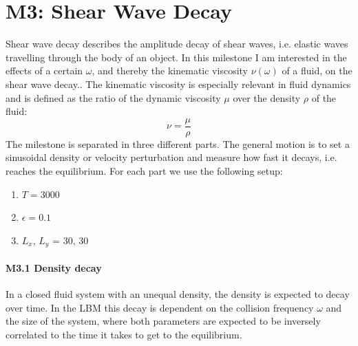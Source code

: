 \documentclass[a4paper,11pt, oneside]{book}
\begin{document}
\section{M3: Shear Wave Decay}
Shear wave decay describes the amplitude decay of shear waves, i.e. elastic waves travelling through the body of an object.
In this milestone I am interested in the effects of a certain $\omega$, and thereby the kinematic viscosity $\nu(\omega)$ of a fluid, on the shear wave decay..
The kinematic viscosity is especially relevant in fluid dynamics and is defined as the ratio of the dynamic viscosity $\mu$ over the density $\rho$ of the fluid:
\begin{equation}
\nu = \frac{\mu}{\rho}
\end{equation}
The milestone is separated in three different parts. 
The general motion is to set a sinusoidal density or velocity
perturbation and measure how fast it decays, i.e. reaches the equilibrium.
For each part we use the following setup:
\begin{enumerate}
    \item $T = 3000$
    \item $\epsilon = 0.1$
    \item $L_{x}$, $L_{y}$ = 30, 30
\end{enumerate}


\paragraph{M3.1 Density decay} 
In a closed fluid system with an unequal density, the density is expected to decay over time. In the LBM this decay is dependent on the collision frequency $\omega$ and the size of the system, where both parameters are expected to be inversely correlated to the time it takes to get to the equilibrium.
\end{document}
